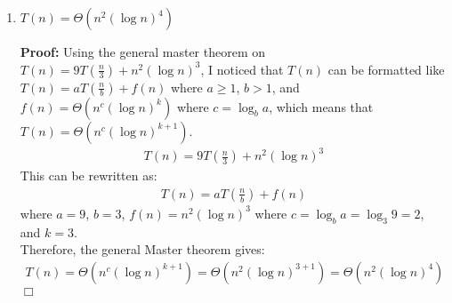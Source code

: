 \documentclass[11pt]{article}
\def\endproofmark{$\Box$}
\newenvironment{proof}{\par{\bf Proof:}}{\endproofmark\smallskip}
\begin{document}
\begin{enumerate}[label=(\alph*)]
\begin{enumerate}[label=(\roman*)]
\begin{proof}
I have also noticed that $\frac{n} {2}{\log{\frac{n} {2}}} = \frac{n} {2}{(\log{n} - \log{2})} = \frac{n} {2}{(\log{n} - 1)}$ and $\frac{n} {2^2}{\log{\frac{n} {2^2}}} = \frac{n} {2^2}{(\log{n} - \log{2^2})} = \frac{n} {2}{(\log{n} - 2)}$ and so $\frac{n} {2^i}{\log{\frac{n} {2^i}}} = \frac{n} {2^i}{(\log{n} - \log{2^i})} = \frac{n} {2}{(\log{n} - i)}$. \\
There are $\log{n}$ layers in this tree. \\
By analyzing this tree, I noticed that the top layer has a greater sum than the layers below it so we can analyze this relation by finding the sum of all rows. I have also noticed that the sum of the top three rows is $(n\log{n}) + (n\log{n - 1}) + (n\log{n - 2}) = (n\log{n} - 0n) + (n\log{n} - 1n) + (n\log{n} - 2n)$. This leads us to the sum of all rows from the top row to the bottom: \\
\begin{align*}
(n\log{n} - 0n) + (n\log{n} - 1n) + (n\log{n} - 2n) + ... + (n\log{n} - k)
\end{align*}
\begin{align*}
= ((\log{n}) * n\log{n}) + {(-n){\sum\limits_{i = 0}^{\log{n}} i}}
\end{align*}
\begin{align*}
= n(\log{n})^2 + (-n)(\frac{n} {2} (\log{n} + 1))
\end{align*}
\begin{align*}
= n(\log{n})^2 - \frac{n^2} {2}(\log{n} + 1) \in \Theta(n^2\log{n})
\end{align*}
\end{proof}

\item
$T(n) = \Theta(n^2(\log{n})^{4})$
\begin{proof}
Using the general master theorem on $T(n) = 9T(\frac{n} {3}) + n^2(\log{n})^3$, I noticed that $T(n)$ can be formatted like $T(n) = aT(\frac{n} {b}) + f(n)$ where $a \geq 1$, $b > 1$, and $f(n) = \Theta(n^c(\log{n})^{k})$ where $c = \log_b{a}$, which means that $T(n) = \Theta(n^c(\log{n})^{k + 1})$. \\
\begin{align*}
T(n) = 9T(\frac{n} {3}) + n^2(\log{n})^3
\end{align*}
This can be rewritten as: \\
\begin{align*}
T(n) = aT(\frac{n} {b}) + f(n) 
\end{align*}
where $a = 9$, $b = 3$, $f(n) = n^2(\log{n})^3$ where $c = \log_b{a} = \log_3{9} = 2$, and $k = 3$.\\
Therefore, the general Master theorem gives: \\
\begin{align*}
T(n) = \Theta(n^c(\log{n})^{k + 1}) = \Theta(n^2(\log{n})^{3 + 1}) = \Theta(n^2(\log{n})^{4})
\end{align*}
\end{proof}
\end{enumerate}
\end{enumerate}
\end{document}
